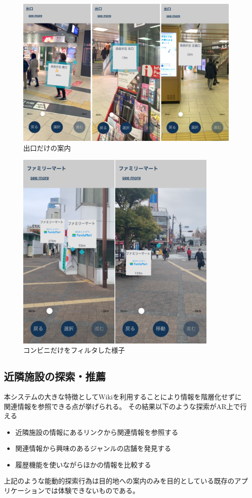\begin{figure}[h]
  \centering
  \includegraphics[width=120mm]{images/ar_navigation_exit.png}
  \caption{出口だけの案内} \label{fig:ar_navigation_exit}
\end{figure}

\begin{figure}[h]
  \centering
  \includegraphics[height=100mm]{images/ar_filter_famima.png}
  \caption{コンビニだけをフィルタした様子} \label{fig:ar_navigation_ad}
\end{figure}

\subsection{近隣施設の探索・推薦}

本システムの大きな特徴としてWikiを利用することにより情報を階層化せずに関連情報を参照できる点が挙げられる。
その結果以下のような探索がAR上で行える
\begin{itemize}
  \item 近隣施設の情報にあるリンクから関連情報を参照する
  \item 関連情報から興味のあるジャンルの店舗を発見する
  \item 履歴機能を使いながらほかの情報を比較する
\end{itemize}
上記のような能動的探索行為は目的地への案内のみを目的としている既存のアプリケーションでは体験できないものである。


